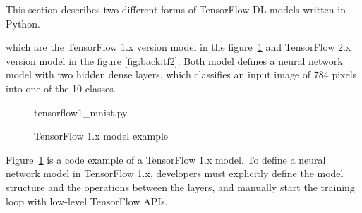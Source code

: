 This section describes two different forms of TensorFlow DL models written in
Python.

which are the TensorFlow 1.x version model 
in the figure~\ref{fig:back:tf1} and TensorFlow 2.x version model in the figure
\ref{fig:back:tf2}.
Both model defines a neural network model with two hidden dense layers,
which classifies an input image of 784 pixels into one of the 10 classes.

\begin{figure}[ht!]

{tensorflow1_mnist.py}
  \caption{TensorFlow 1.x model example}
\label{fig:back:tf1}
\end{figure}

Figure~\ref{fig:back:tf1} is a code example of a TensorFlow 1.x model.
To define a neural network model in TensorFlow 1.x, 
developers must explicitly define the model structure
and the operations between the layers, 
and manually start the training loop with low-level TensorFlow APIs.

